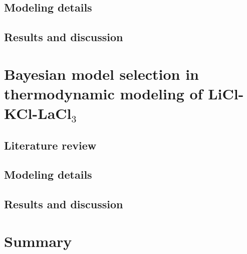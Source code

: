 \subsection{Modeling details} \label{moltensalts:ssec:LiFLnF3model}


\subsection{Results and discussion} \label{moltensalts:ssec:LiFLnF3result}


\section{Bayesian model selection in thermodynamic modeling of LiCl-KCl-LaCl${_3}$} \label{moltensalts:sec:LaCl3}

\subsection{Literature review} \label{moltensalts:ssec:LaCl3lit}


\subsection{Modeling details} \label{moltensalts:ssec:LaCl3model}


    \subsection{Results and discussion} \label{moltensalts:ssec:LaCl3result}


\section{Summary} \label{moltensalts:sec:Summary}
